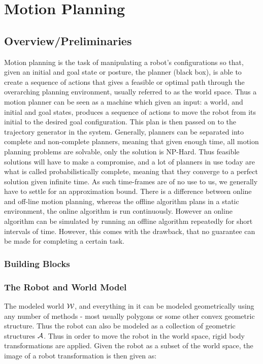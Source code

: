 \chapter{Motion Planning}


\section{Overview/Preliminaries}
Motion planning is the task of manipulating a robot's configurations so that,
given an initial and goal state or posture, the planner (black box), is able to
create a sequence of actions that gives a feasible or optimal path through the
overarching planning environment, usually referred to as the world space. Thus a
motion planner can be seen as a machine which given an input: a world, and
initial and goal states, produces a sequence of actions to move the robot from
its initial to the desired goal configuration. This plan is then passed on to
the trajectory generator in the system. Generally, planners can be separated
into complete and non-complete planners, meaning that given enough time, all
motion planning problems are solvable, only the solution is NP-Hard. Thus
feasible solutions will have to make a compromise, and a lot of planners in use
today are what is called probabilistically complete, meaning that they converge
to a perfect solution given infinite time. As such time-frames are of no use to us, we
generally have to settle for an approximation bound. There is a difference
between online and off-line motion planning, whereas the offline algorithm plans
in a static environment, the online algorithm is run continuously. However an
online algorithm can be simulated by running an offline algorithm repeatedly for
short intervals of time. However, this comes with the drawback, that no
guarantee can be made for completing a certain task.

\subsection{Building Blocks}

\subsection{The Robot and World Model}

The modeled world \(\mathcal{W}\), and everything in it can be modeled
geometrically using any number of methods - most usually polygons or some other
convex geometric structure. Thus the robot can also be modeled as a collection
of geometric structures \(\mathcal{A}\). Thus in order to move the robot in the
world space, rigid body transformations are applied. Given the robot as a subset
of the world space, the image of a robot transformation is then given as:

